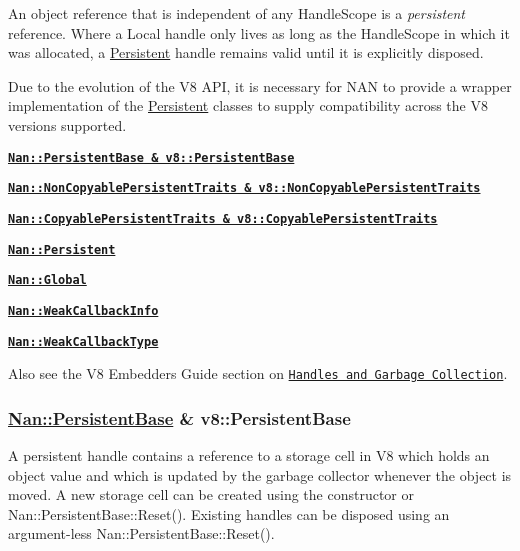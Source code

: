 An object reference that is independent of any {\ttfamily Handle\+Scope} is a {\itshape persistent} reference. Where a {\ttfamily Local} handle only lives as long as the {\ttfamily Handle\+Scope} in which it was allocated, a {\ttfamily \hyperlink{class_persistent}{Persistent}} handle remains valid until it is explicitly disposed.

Due to the evolution of the V8 A\+PI, it is necessary for N\+AN to provide a wrapper implementation of the {\ttfamily \hyperlink{class_persistent}{Persistent}} classes to supply compatibility across the V8 versions supported.


\begin{DoxyItemize}
\item \href{#api_nan_persistent_base}{\tt {\bfseries {\ttfamily Nan\+::\+Persistent\+Base \& v8\+::\+Persistent\+Base}}}
\item \href{#api_nan_non_copyable_persistent_traits}{\tt {\bfseries {\ttfamily Nan\+::\+Non\+Copyable\+Persistent\+Traits \& v8\+::\+Non\+Copyable\+Persistent\+Traits}}}
\item \href{#api_nan_copyable_persistent_traits}{\tt {\bfseries {\ttfamily Nan\+::\+Copyable\+Persistent\+Traits \& v8\+::\+Copyable\+Persistent\+Traits}}}
\item \href{#api_nan_persistent}{\tt {\bfseries {\ttfamily Nan\+::\+Persistent}}}
\item \href{#api_nan_global}{\tt {\bfseries {\ttfamily Nan\+::\+Global}}}
\item \href{#api_nan_weak_callback_info}{\tt {\bfseries {\ttfamily Nan\+::\+Weak\+Callback\+Info}}}
\item \href{#api_nan_weak_callback_type}{\tt {\bfseries {\ttfamily Nan\+::\+Weak\+Callback\+Type}}}
\end{DoxyItemize}

Also see the V8 Embedders Guide section on \href{https://developers.google.com/v8/embed#handles}{\tt Handles and Garbage Collection}.

\label{_api_nan_persistent_base}%
 \subsubsection*{\hyperlink{class_nan_1_1_persistent_base}{Nan\+::\+Persistent\+Base} \& v8\+::\+Persistent\+Base}

A persistent handle contains a reference to a storage cell in V8 which holds an object value and which is updated by the garbage collector whenever the object is moved. A new storage cell can be created using the constructor or {\ttfamily Nan\+::\+Persistent\+Base\+::\+Reset()}. Existing handles can be disposed using an argument-\/less {\ttfamily Nan\+::\+Persistent\+Base\+::\+Reset()}.

